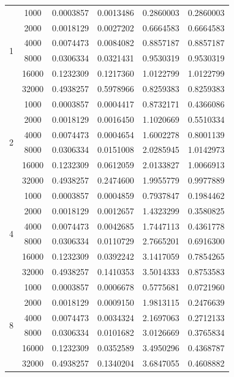 \documentclass[11pt,a4paper]{article}
\begin{document}
\begin{center}
\begin{longtable}{ccrrrr}
\multirow{6}{*}{1} 
 & 1000  & 0.0003857 & 0.0013486 & 0.2860003 & 0.2860003 \\
 & 2000  & 0.0018129 & 0.0027202 & 0.6664583 & 0.6664583 \\
 & 4000  & 0.0074473 & 0.0084082 & 0.8857187 & 0.8857187 \\
 & 8000  & 0.0306334 & 0.0321431 & 0.9530319 & 0.9530319 \\
 & 16000 & 0.1232309 & 0.1217360 & 1.0122799 & 1.0122799 \\
 & 32000 & 0.4938257 & 0.5978966 & 0.8259383 & 0.8259383 \\ \hline
\multirow{6}{*}{2} 
 & 1000  & 0.0003857 & 0.0004417 & 0.8732171 & 0.4366086 \\
 & 2000  & 0.0018129 & 0.0016450 & 1.1020669 & 0.5510334 \\
 & 4000  & 0.0074473 & 0.0004654 & 1.6002278 & 0.8001139 \\
 & 8000  & 0.0306334 & 0.0151008 & 2.0285945 & 1.0142973 \\
 & 16000 & 0.1232309 & 0.0612059 & 2.0133827 & 1.0066913 \\
 & 32000 & 0.4938257 & 0.2474600 & 1.9955779 & 0.9977889 \\ \hline
\multirow{6}{*}{4} 
 & 1000  & 0.0003857 & 0.0004859 & 0.7937847 & 0.1984462 \\
 & 2000  & 0.0018129 & 0.0012657 & 1.4323299 & 0.3580825 \\
 & 4000  & 0.0074473 & 0.0042685 & 1.7447113 & 0.4361778 \\
 & 8000  & 0.0306334 & 0.0110729 & 2.7665201 & 0.6916300 \\
 & 16000 & 0.1232309 & 0.0392242 & 3.1417059 & 0.7854265 \\
 & 32000 & 0.4938257 & 0.1410353 & 3.5014333 & 0.8753583 \\ \hline
\multirow{6}{*}{8} 
 & 1000  & 0.0003857 & 0.0006678 & 0.5775681 & 0.0721960 \\
 & 2000  & 0.0018129 & 0.0009150 & 1.9813115 & 0.2476639 \\
 & 4000  & 0.0074473 & 0.0034324 & 2.1697063 & 0.2712133 \\
 & 8000  & 0.0306334 & 0.0101682 & 3.0126669 & 0.3765834 \\
 & 16000 & 0.1232309 & 0.0352589 & 3.4950296 & 0.4368787 \\
 & 32000 & 0.4938257 & 0.1340204 & 3.6847055 & 0.4608882 \\
\end{longtable}
\end{center}
\end{document}
